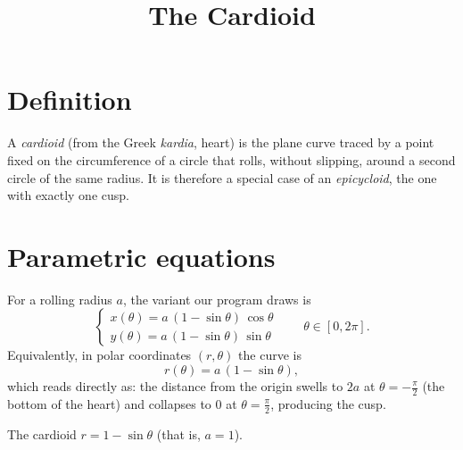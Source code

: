 \documentclass[11pt]{article}
\title{The Cardioid}
\author{}
\date{}
\begin{document}
\maketitle
\thispagestyle{fancy}

\section{Definition}

A \emph{cardioid} (from the Greek \emph{kardia}, heart) is the plane curve
traced by a point fixed on the circumference of a circle that rolls, without
slipping, around a second circle of the same radius. It is therefore a special
case of an \emph{epicycloid}, the one with exactly one cusp.

\section{Parametric equations}

For a rolling radius $a$, the variant our program draws is
\begin{equation}
  \begin{cases}
    x(\theta) = a\,(1 - \sin\theta)\,\cos\theta \\
    y(\theta) = a\,(1 - \sin\theta)\,\sin\theta
  \end{cases}
  \qquad \theta \in [0, 2\pi].
\end{equation}
Equivalently, in polar coordinates $(r, \theta)$ the curve is
\begin{equation}
  r(\theta) = a\,(1 - \sin\theta),
\end{equation}
which reads directly as: the distance from the origin swells to $2a$ at
$\theta = -\frac{\pi}{2}$ (the bottom of the heart) and collapses to $0$ at
$\theta = \frac{\pi}{2}$, producing the cusp.

\begin{center}

\smallskip
The cardioid $r = 1 - \sin\theta$ (that is, $a = 1$).
\end{center}
\end{document}
